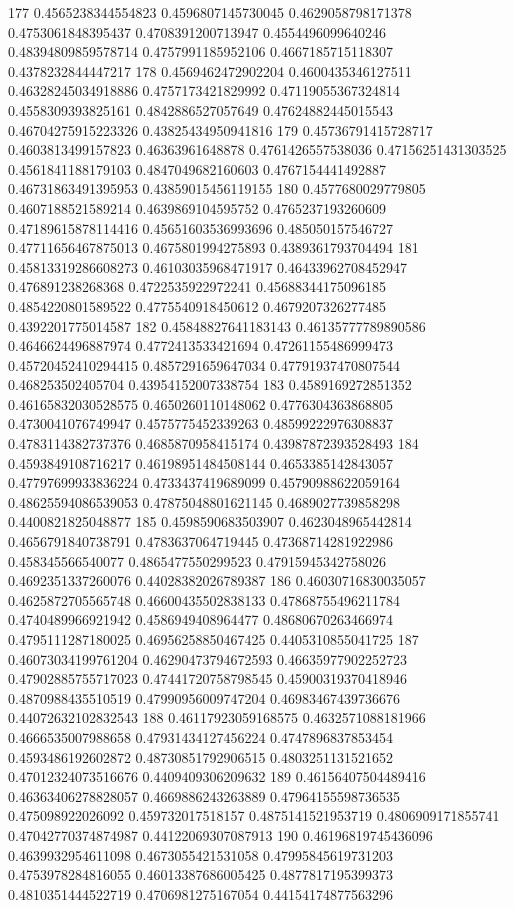 177 0.4565238344554823 0.4596807145730045 0.4629058798171378 0.4753061848395437 0.4708391200713947 0.4554496099640246 0.48394809859578714 0.4757991185952106 0.4667185715118307 0.4378232844447217
178 0.4569462472902204 0.4600435346127511 0.46328245034918886 0.4757173421829992 0.47119055367324814 0.4558309393825161 0.4842886527057649 0.47624882445015543 0.46704275915223326 0.43825434950941816
179 0.45736791415728717 0.4603813499157823 0.46363961648878 0.4761426557538036 0.47156251431303525 0.4561841188179103 0.4847049682160603 0.4767154441492887 0.46731863491395953 0.43859015456119155
180 0.4577680029779805 0.4607188521589214 0.4639869104595752 0.4765237193260609 0.47189615878114416 0.45651603536993696 0.485050157546727 0.47711656467875013 0.4675801994275893 0.4389361793704494
181 0.45813319286608273 0.46103035968471917 0.46433962708452947 0.476891238268368 0.4722535922972241 0.45688344175096185 0.4854220801589522 0.4775540918450612 0.4679207326277485 0.4392201775014587
182 0.45848827641183143 0.46135777789890586 0.4646624496887974 0.4772413533421694 0.47261155486999473 0.45720452410294415 0.4857291659647034 0.47791937470807544 0.468253502405704 0.43954152007338754
183 0.4589169272851352 0.46165832030528575 0.4650260110148062 0.4776304363868805 0.4730041076749947 0.4575775452339263 0.48599222976308837 0.4783114382737376 0.4685870958415174 0.43987872393528493
184 0.4593849108716217 0.46198951484508144 0.4653385142843057 0.47797699933836224 0.4733437419689099 0.45790988622059164 0.48625594086539053 0.47875048801621145 0.4689027739858298 0.4400821825048877
185 0.4598590683503907 0.4623048965442814 0.4656791840738791 0.4783637064719445 0.47368714281922986 0.458345566540077 0.4865477550299523 0.47915945342758026 0.4692351337260076 0.44028382026789387
186 0.46030716830035057 0.4625872705565748 0.46600435502838133 0.47868755496211784 0.4740489966921942 0.4586949408964477 0.48680670263466974 0.4795111287180025 0.46956258850467425 0.4405310855041725
187 0.46073034199761204 0.46290473794672593 0.46635977902252723 0.47902885755717023 0.47441720758798545 0.45900319370418946 0.4870988435510519 0.47990956009747204 0.46983467439736676 0.44072632102832543
188 0.46117923059168575 0.4632571088181966 0.4666535007988658 0.47931434127456224 0.4747896837853454 0.4593486192602872 0.48730851792906515 0.4803251131521652 0.47012324073516676 0.4409409306209632
189 0.46156407504489416 0.46363406278828057 0.4669886243263889 0.47964155598736535 0.475098922026092 0.459732017518157 0.4875141521953719 0.4806909171855741 0.47042770374874987 0.44122069307087913
190 0.46196819745436096 0.4639932954611098 0.4673055421531058 0.47995845619731203 0.4753978284816055 0.46013387686005425 0.4877817195399373 0.4810351444522719 0.4706981275167054 0.44154174877563296